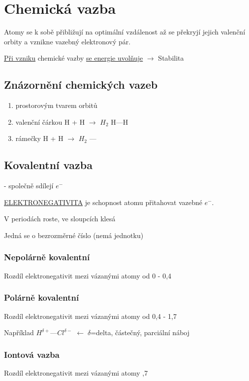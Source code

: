 \section{Chemická vazba}
Atomy se k sobě přibližují na optimální vzdálenost až se překryjí jejich valenční orbity a vznikne vazebný elektronový pár.

\underline{Při vzniku} chemické vazby \underline{se energie uvolňuje} $\rightarrow$ Stabilita

\subsection{Znázornění chemických vazeb}
\TabPositions{0em, 15em, 30em}
\begin{enumerate}
    \item prostorovým tvarem orbitů
    \item valenční čárkou \tab H + H $\longrightarrow$ $H_2$ \tab H---H
    \item rámečky \tab H + H $\longrightarrow$ $H_2$ \tab \fbox{$\rightarrow$}---\fbox{$\leftarrow$}
\end{enumerate}

\subsection{Kovalentní vazba} - společně sdílejí $e^-$

\vspace{1em}
\underline{ELEKTRONEGATIVITA} je schopnost atomu přitahovat vazebné $e^-$.

V periodách roste, ve sloupcích klesá

Jedná se o bezrozměrné číslo (nemá jednotku)

\subsubsection{Nepolárně kovalentní}
Rozdíl elektronegativit mezi vázanými atomy od 0 - 0,4

\subsubsection{Polárně kovalentní}
Rozdíl elektronegativit mezi vázanými atomy od 0,4 - 1,7

Například $H^{\delta+}$---$Cl^{\delta-}$ $\longleftarrow \; \delta$=delta, částečný, parciální náboj

\subsubsection{Iontová vazba}
Rozdíl elektronegativit mezi vázanými atomy ,7


